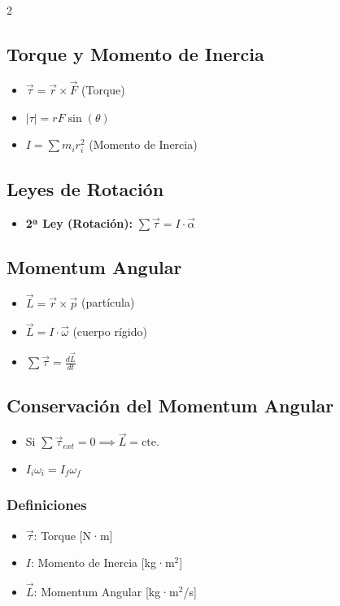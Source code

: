 \documentclass[11pt]{article}
\begin{document}
\begin{multicols}{2}
\begin{tcolorbox}[title=Dinámica Rotacional]
\subsection*{Torque y Momento de Inercia}
\begin{itemize}
    \item $\vec{\tau} = \vec{r} \times \vec{F}$ (Torque)
    \item $|\tau| = r F \sin(\theta)$
    \item $I = \sum m_i r_i^2$ (Momento de Inercia)
\end{itemize}

\subsection*{Leyes de Rotación}
\begin{itemize}
    \item \textbf{2ª Ley (Rotación):} $\sum \vec{\tau} = I \cdot \vec{\alpha}$
\end{itemize}

\subsection*{Momentum Angular}
\begin{itemize}
    \item $\vec{L} = \vec{r} \times \vec{p}$ (partícula)
    \item $\vec{L} = I \cdot \vec{\omega}$ (cuerpo rígido)
    \item $\sum \vec{\tau} = \frac{d\vec{L}}{dt}$
\end{itemize}

\subsection*{Conservación del Momentum Angular}
\begin{itemize}
    \item Si $\sum \vec{\tau}_{ext} = 0 \implies \vec{L} = \text{cte.}$
    \item $I_i \omega_i = I_f \omega_f$
\end{itemize}

\subsubsection*{Definiciones}
\begin{itemize}
    \item $\vec{\tau}$: Torque [N·m]
    \item $I$: Momento de Inercia [kg·m$^2$]
    \item $\vec{L}$: Momentum Angular [kg·m$^2$/s]
\end{itemize}
\end{tcolorbox}

\end{multicols} %
\end{document}
